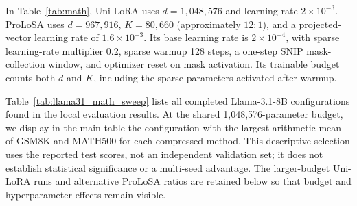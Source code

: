 In Table~\ref{tab:math}, Uni-LoRA uses $d=1{,}048{,}576$ and learning rate $2\times10^{-3}$. ProLoSA uses $d=967{,}916$, $K=80{,}660$ (approximately $12:1$), and a projected-vector learning rate of $1.6\times10^{-3}$. Its base learning rate is $2\times10^{-4}$, with sparse learning-rate multiplier 0.2, sparse warmup 128 steps, a one-step SNIP mask-collection window, and optimizer reset on mask activation. Its trainable budget counts both $d$ and $K$, including the sparse parameters activated after warmup.

Table~\ref{tab:llama31_math_sweep} lists all completed Llama-3.1-8B configurations found in the local evaluation results. At the shared 1,048,576-parameter budget, we display in the main table the configuration with the largest arithmetic mean of GSM8K and MATH500 for each compressed method. This descriptive selection uses the reported test scores, not an independent validation set; it does not establish statistical significance or a multi-seed advantage. The larger-budget Uni-LoRA runs and alternative ProLoSA ratios are retained below so that budget and hyperparameter effects remain visible.

